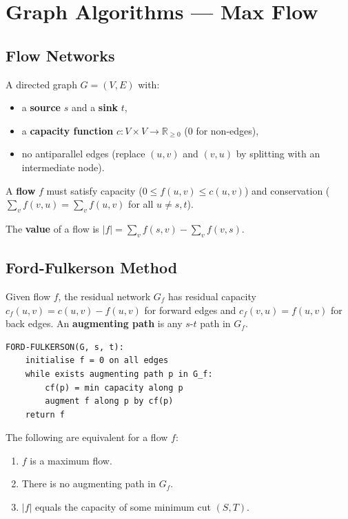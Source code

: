 \documentclass[11pt,a4paper,openany]{book}
\begin{document}
\chapter{Graph Algorithms — Max Flow}

\section{Flow Networks}

\begin{defnbox}[title=Flow network]
A directed graph $G = (V, E)$ with:
\begin{itemize}
  \item a \textbf{source} $s$ and a \textbf{sink} $t$,
  \item a \textbf{capacity function} $c : V \times V \to \mathbb{R}_{\geq 0}$ (0 for non-edges),
  \item no antiparallel edges (replace $(u,v)$ and $(v,u)$ by splitting with an intermediate node).
\end{itemize}
A \textbf{flow} $f$ must satisfy capacity ($0 \leq f(u,v) \leq c(u,v)$) and conservation
($\sum_v f(v,u) = \sum_v f(u,v)$ for all $u \neq s, t$).
\end{defnbox}

The \textbf{value} of a flow is $|f| = \sum_v f(s,v) - \sum_v f(v,s)$.

\section{Ford-Fulkerson Method}

\begin{defnbox}[title=Residual network]
Given flow $f$, the residual network $G_f$ has residual capacity
$c_f(u,v) = c(u,v) - f(u,v)$ for forward edges and $c_f(v,u) = f(u,v)$ for back edges.
An \textbf{augmenting path} is any $s$-$t$ path in $G_f$.
\end{defnbox}

\begin{lstlisting}
FORD-FULKERSON(G, s, t):
    initialise f = 0 on all edges
    while exists augmenting path p in G_f:
        cf(p) = min capacity along p
        augment f along p by cf(p)
    return f
\end{lstlisting}

\begin{thmbox}[title=Max-flow min-cut theorem]
The following are equivalent for a flow $f$:
\begin{enumerate}
  \item $f$ is a maximum flow.
  \item There is no augmenting path in $G_f$.
  \item $|f|$ equals the capacity of some minimum cut $(S, T)$.
\end{enumerate}
\end{thmbox}
\end{document}
